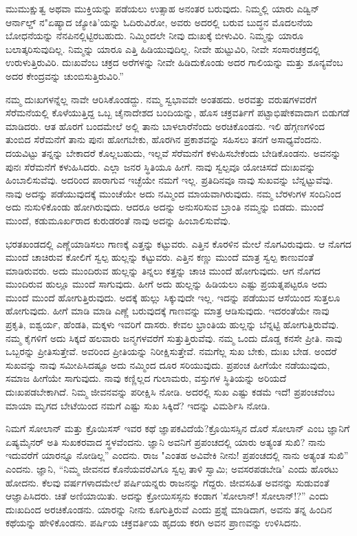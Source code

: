 ಮುಮುಕ್ಷುತ್ವ ಅಥವಾ ಮುಕ್ತಿಯನ್ನು ಪಡೆಯಲು ಉತ್ಸಾಹ ಅನಂತರ ಬರುವುದು. ನಿಮ್ಮಲ್ಲಿ ಯಾರು ಎಡ್ವಿನ್ ಆರ್ನಾಲ್ಡ್ ನ"ಏಷ್ಯಾದ ಜ್ಯೋತಿ'ಯನ್ನು ಓದಿರುವಿರೋ, ಅವರು ಅದರಲ್ಲಿ ಬರುವ ಬುದ್ಧನ ಮೊದಲನೆಯ ಬೋಧನೆಯನ್ನು ನೆನಪಿನಲ್ಲಿಟ್ಟಿರಬಹುದು. ನಿಮ್ಮಿಂದಲೇ ನೀವು ದುಃಖಕ್ಕೆ ಬೀಳುವಿರಿ. ನಿಮ್ಮನ್ನು ಯಾರೂ ಬಲಾತ್ಕರಿಸುವುದಿಲ್ಲ. ನಿಮ್ಮನ್ನು ಯಾರೂ ಎತ್ತಿ ಹಿಡಿಯುವುದಿಲ್ಲ. ನೀವೇ ಹುಟ್ಟುವಿರಿ, ನೀವೇ ಸಂಸಾರಚಕ್ರದಲ್ಲಿ ಉರುಳುತ್ತಿರುವಿರಿ. ದುಃಖವೆಂಬ ಚಕ್ರದ ಅರೆಗಳನ್ನು ನೀವೇ ಹಿಡಿದುಕೊಂಡು ಅದರ ಗಾಲಿಯನ್ನು ಮತ್ತು ಶೂನ್ಯವೆಂಬ ಅದರ ಕೇಂದ್ರವನ್ನು ಚುಂಬಿಸುತ್ತಿರುವಿರಿ.”

ನಮ್ಮ ದುಃಖಗಳನ್ನೆಲ್ಲ ನಾವೇ ಆರಿಸಿಕೊಂಡದ್ದು. ನಮ್ಮ ಸ್ವಭಾವವೇ ಅಂತಹದು. ಅರವತ್ತು ವರುಷಗಳವರೆಗೆ ಸೆರೆಮನೆಯಲ್ಲಿ ಕೊಳೆಯುತ್ತಿದ್ದ ಒಬ್ಬ ಚೈನಾದೇಶದ ಬಂದಿಯನ್ನು, ಹೊಸ ಚಕ್ರವರ್ತಿಗೆ ಪಟ್ಟಾಭಿಷೇಕವಾದಾಗ ಬಿಡುಗಡೆ ಮಾಡಿದರು. ಆತ ಹೊರಗೆ ಬಂದಮೇಲೆ ಅಲ್ಲಿ ತಾನು ಬಾಳಲಾರೆನೆಂದು ಅರಚಿಕೊಂಡನು. ಇಲಿ ಹೆಗ್ಗಣಗಳಿಂದ ತುಂಬಿದ ಸೆರೆಮನೆಗೆ ತಾನು ಪುನಃ ಹೋಗಬೇಕು, ಹೊರಗಿನ ಪ್ರಕಾಶವನ್ನು ಸಹಿಸಲು ತನಗೆ ಅಸಾಧ್ಯವೆಂದನು. ದಯವಿಟ್ಟು ತನ್ನನ್ನು ಬೇಕಾದರೆ ಕೊಲ್ಲಬಹುದು, ಇಲ್ಲವೆ ಸೆರೆಮನೆಗೆ ಕಳುಹಿಸಬೇಕೆಂದು ಬೇಡಿಕೊಂಡನು. ಅವನನ್ನು ಪುನಃ ಸೆರೆಮನೆಗೆ ಕಳುಹಿಸಿದರು. ಎಲ್ಲಾ ಜನರ ಸ್ಥಿತಿಯೂ ಹೀಗೆ. ನಾವು ಸ್ವಲ್ಪವೂ ಯೋಚಿಸದೆ ದುಃಖವನ್ನು ಹಿಂಬಾಲಿಸುವೆವು. ಅದರಿಂದ ಪಾರಾಗುವ ಇಚ್ಛೆಯೇ ನಮಗೆ ಇಲ್ಲ. ಪ್ರತಿದಿನವೂ ನಾವು ಸುಖವನ್ನು ಬೆನ್ನಟ್ಟುವೆವು. ನಾವು ಅದನ್ನು ಪಡೆಯುವುದಕ್ಕೆ ಮುಂಚೆಯೇ ಅದು ನಮ್ಮಿಂದ ಮಾಯವಾಗಿರುವುದು. ನಮ್ಮ ಬೆರಳುಗಳ ಸಂದಿನಿಂದ ಅದು ನುಸುಳಿಕೊಂಡು ಹೋಗಿರುವುದು. ಆದರೂ ಅದನ್ನು ಅನುಸರಿಸುವ ಬ್ರಾಂತಿ ನಮ್ಮನ್ನು ಬಿಡದು. ಮುಂದೆ ಮುಂದೆ, ಕಡುಮೂರ್ಖರಾದ ಕುರುಡರಂತೆ ನಾವು ಅದನ್ನು ಹಿಂಬಾಲಿಸುವೆವು.

ಭರತಖಂಡದಲ್ಲಿ ಎಣ್ಣೆಯಾಡಿಸಲು ಗಾಣಕ್ಕೆ ಎತ್ತನ್ನು ಕಟ್ಟುವರು. ಎತ್ತಿನ ಕೊರಳಿನ ಮೇಲೆ ನೊಗವಿರುವುದು. ಆ ನೊಗದ ಮುಂದೆ ಚಾಚಿರುವ ಕೋಲಿಗೆ ಸ್ವಲ್ಪ ಹುಲ್ಲನ್ನು ಕಟ್ಟುವರು. ಎತ್ತಿನ ಕಣ್ಣು ಮುಂದೆ ಮಾತ್ರ ಸ್ವಲ್ಪ ಕಾಣುವಂತೆ ಮಾಡಿರುವರು. ಅದು ಮುಂದಿರುವ ಹುಲ್ಲನ್ನು ತಿನ್ನಲು ಕತ್ತನ್ನು ಚಾಚಿ ಮುಂದೆ ಹೋಗುವುದು. ಆಗ ನೊಗದ ಮುಂದಿರುವ ಹುಲ್ಲೂ ಮುಂದೆ ಸಾಗುವುದು. ಹೀಗೆ ಅದು ಹುಲ್ಲನ್ನು ಹಿಡಿಯಲು ಎಷ್ಟು ಪ್ರಯತ್ನಪಟ್ಟರೂ ಅದು ಮುಂದೆ ಮುಂದೆ ಹೋಗುತ್ತಿರುವುದು. ಅದಕ್ಕೆ ಹುಲ್ಲು ಸಿಕ್ಕುವುದೇ ಇಲ್ಲ. ಇದನ್ನು ಪಡೆಯುವ ಆಸೆಯಿಂದ ಸುತ್ತಲೂ ಹೋಗುವುದು. ಹೀಗೆ ಮಾಡಿ ಮಾಡಿ ಎಣ್ಣೆ ಬರುವುದಕ್ಕೆ ಗಾಣವನ್ನು ಮಾತ್ರ ಆಡಿಸುವುದು. ಇದರಂತೆಯೇ ನಾವು ಪ್ರಕೃತಿ, ಐಶ್ವರ್ಯ, ಹೆಂಡತಿ, ಮಕ್ಕಳು ಇವರಿಗೆ ದಾಸರು. ಕೇವಲ ಭ್ರಾಂತಿಯ ಹುಲ್ಲನ್ನು ಬೆನ್ನಟ್ಟಿ ಹೋಗುತ್ತಿರುವೆವು. ನಮ್ಮ ಕೈಗಳಿಗೆ ಅದು ಸಿಕ್ಕದೆ ಹಲವಾರು ಜನ್ಮಗಳವರೆಗೆ ಸುತ್ತುತ್ತಿರುವೆವು. ನಮ್ಮ ಒಂದು ದೊಡ್ಡ ಕನಸೇ ಪ್ರೀತಿ. ನಾವು ಒಬ್ಬರನ್ನು ಪ್ರೀತಿಸುತ್ತೇವೆ. ಅವರಿಂದ ಪ್ರೀತಿಯನ್ನು ನಿರೀಕ್ಷಿಸುತ್ತೇವೆ. ನಮಗೆಲ್ಲ ಸುಖ ಬೇಕು, ದುಃಖ ಬೇಡ. ಅಂದರೆ ಸುಖವನ್ನು ನಾವು ಸಮೀಪಿಸಿದಷ್ಟೂ ಅದು ನಮ್ಮಿಂದ ದೂರ ಸರಿಯುವುದು. ಪ್ರಪಂಚ ಹೀಗೆಯೇ ನಡೆಯುವುದು, ಸಮಾಜ ಹೀಗೆಯೇ ಸಾಗುವುದು. ನಾವು ಕಣ್ಣಿಲ್ಲದ ಗುಲಾಮರು, ವಸ್ತುಗಳ ಸ್ಥಿತಿಯನ್ನು ಅರಿಯದೆ ದುಃಖಪಡಬೇಕಾಗಿದೆ. ನಿಮ್ಮ ಜೀವನವನ್ನು ಪರೀಕ್ಷಿಸಿ ನೋಡಿ. ಅದರಲ್ಲಿ ಸುಖ ಎಷ್ಟು ಕಡಮೆ ಇದೆ! ಪ್ರಪಂಚವೆಂಬ ಮಾಯಾ ಮೃಗದ ಬೇಟೆಯಿಂದ ನಮಗೆ ಎಷ್ಟು ಸುಖ ಸಿಕ್ಕಿದೆ? ಇದನ್ನು ವಿಮರ್ಶಿಸಿ ನೋಡಿ.

ನಿಮಗೆ ಸೋಲಾನ್ ಮತ್ತು ಕ್ರೊಯಿಸಸ್ ಇವರ ಕಥೆ ಜ್ಞಾಪಕವಿದೆಯೆ?\break ಕ್ರೊಯಿಸಸ್ಸಿನ ದೊರೆ ಸೋಲಾನ್ ಎಂಬ ಜ್ಞಾನಿಗೆ ಏಷ್ಯಮೈನರ್ ಅತಿ ಸುಖಕರವಾದ ಸ್ಥಳವೆಂದನು. ಜ್ಞಾನಿ ಅವನಿಗೆ ಪ್ರಪಂಚದಲ್ಲಿ ಯಾರು ಅತ್ಯಂತ ಸುಖಿ? ನಾನು ಇದುವರೆಗೆ ಯಾರನ್ನೂ ನೋಡಿಲ್ಲ” ಎಂದನು. ರಾಜ "ಎಂತಹ ಅವಿವೇಕಿ ನೀನು! ಪ್ರಪಂಚದಲ್ಲಿ ನಾನು ಅತ್ಯಂತ ಸುಖಿ'' ಎಂದನು. ಜ್ಞಾನಿ, “ನಿಮ್ಮ ಜೀವನದ ಕೊನೆಯವರೆವಿಗೂ ಸ್ವಲ್ಪ ತಾಳಿ ಸ್ವಾಮಿ; ಅವಸರಪಡಬೇಡಿ' ಎಂದು ಹೊರಟು ಹೋದನು. ಕೆಲವು ವರ್ಷಗಳಾದಮೇಲೆ ಪರ್ಷಿಯನ್ನರು ರಾಜನನ್ನು ಗೆದ್ದರು. ಜೀವಸಹಿತ ಅವನನ್ನು ಸುಡುವಂತೆ ಆಜ್ಞಾಪಿಸಿದರು. ಚಿತೆ ಅಣಿಯಾಯಿತು. ಅದನ್ನು ಕ್ರೋಯಿಸಸ್ಸನು ಕಂಡಾಗ 'ಸೋಲಾನ್! ಸೋಲಾನ್!?” ಎಂದು ದುಃಖದಿಂದ ಅರಚಿಕೊಂಡನು. ಯಾರನ್ನು ನೀನು ಕೂಗುತ್ತಿರುವೆ ಎಂದು ಪ್ರಶ್ನೆ ಮಾಡಿದಾಗ, ಅವನು ತನ್ನ ಹಿಂದಿನ ಕಥೆಯನ್ನು ಹೇಳಿಕೊಂಡನು. ಪರ್ಷಿಯ ಚಕ್ರವರ್ತಿಯ ಹೃದಯ ಕರಗಿ ಅವನ ಪ್ರಾಣವನ್ನು ಉಳಿಸಿದನು.

